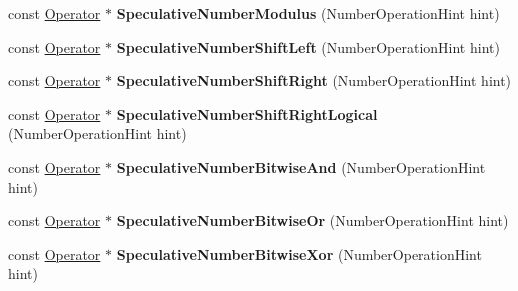 \begin{DoxyCompactItemize}
const \mbox{\hyperlink{classv8_1_1internal_1_1compiler_1_1Operator}{Operator}} $\ast$ {\bfseries Speculative\+Number\+Modulus} (Number\+Operation\+Hint hint)
\item 
\mbox{\label{classv8_1_1internal_1_1compiler_1_1SimplifiedOperatorBuilder_a99551513eb75fb43f92c70c24a7df0ab}} 
const \mbox{\hyperlink{classv8_1_1internal_1_1compiler_1_1Operator}{Operator}} $\ast$ {\bfseries Speculative\+Number\+Shift\+Left} (Number\+Operation\+Hint hint)
\item 
\mbox{\label{classv8_1_1internal_1_1compiler_1_1SimplifiedOperatorBuilder_ad4b9356fc95fd654e4b1a8d623c2774b}} 
const \mbox{\hyperlink{classv8_1_1internal_1_1compiler_1_1Operator}{Operator}} $\ast$ {\bfseries Speculative\+Number\+Shift\+Right} (Number\+Operation\+Hint hint)
\item 
\mbox{\label{classv8_1_1internal_1_1compiler_1_1SimplifiedOperatorBuilder_aa9e8f92900282bec67a08d6576f4db2e}} 
const \mbox{\hyperlink{classv8_1_1internal_1_1compiler_1_1Operator}{Operator}} $\ast$ {\bfseries Speculative\+Number\+Shift\+Right\+Logical} (Number\+Operation\+Hint hint)
\item 
\mbox{\label{classv8_1_1internal_1_1compiler_1_1SimplifiedOperatorBuilder_a63266e608c60b5ad62c032fa958ba0b7}} 
const \mbox{\hyperlink{classv8_1_1internal_1_1compiler_1_1Operator}{Operator}} $\ast$ {\bfseries Speculative\+Number\+Bitwise\+And} (Number\+Operation\+Hint hint)
\item 
\mbox{\label{classv8_1_1internal_1_1compiler_1_1SimplifiedOperatorBuilder_a84efbf53b4f9c98720c421494cc592da}} 
const \mbox{\hyperlink{classv8_1_1internal_1_1compiler_1_1Operator}{Operator}} $\ast$ {\bfseries Speculative\+Number\+Bitwise\+Or} (Number\+Operation\+Hint hint)
\item 
\mbox{\label{classv8_1_1internal_1_1compiler_1_1SimplifiedOperatorBuilder_a0bf8e767ce20cda0abcebce73f634d29}} 
const \mbox{\hyperlink{classv8_1_1internal_1_1compiler_1_1Operator}{Operator}} $\ast$ {\bfseries Speculative\+Number\+Bitwise\+Xor} (Number\+Operation\+Hint hint)

\end{DoxyCompactItemize}
